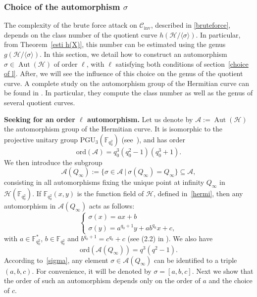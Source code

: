 \documentclass[10pt]{article}
\theoremstyle{definition}
\theoremstyle{definition}
\theoremstyle{definition}
\newcommand{\C}{\mathcal{C}}
\newcommand{\calA}{\mathcal{A}}
\newcommand{\calH}{\mathcal{H}}
\newcommand{\su}{\subseteq}
\newcommand{\h}{\mathcal{H}}
\newcommand{\Aut}{\operatorname{Aut}}
\begin{document}
\subsubsection{Choice of the automorphism $\sigma$} \label{choice_of_sigma}


The complexity of the brute force attack on $\C_{\textrm{inv}}$, described in \ref{bruteforce}, depends on the class number of the quotient curve $h(\mathcal{H}/\langle \sigma \rangle)$. In particular, from Theorem~\ref{esti h(X)}, this number can be estimated using the genus $g(\mathcal{H}/\langle \sigma \rangle)$. In this section, we detail how to construct an automorphism $\sigma \in \Aut(\h)$ of order $\ell$, with $\ell$ satisfying both conditions of section~\ref{choice of l}. After, we will see the influence of this choice on the genus of the quotient curve. A complete study on the automorphism group of the Hermitian curve can be found in \cite{Gar}. In particular, they compute the class number as well as the genus of several quotient curves. 

\vspace*{0.2cm}

\noindent \textbf{Seeking for an order $\ell$ automorphism.} Let us denote by $\calA := \Aut(\calH)$ the automorphism group of the Hermitian curve. It is isomorphic to the projective unitary group $\mathrm{PGU}_3(\mathbb{F}_{q_0^2})$ (see~\cite{Sti}), and has order 
\[\mathrm{ord}(\calA) =  q_0^3(q_0^2-1)(q_0^3+1).\]
We then introduce the subgroup
\[\calA(Q_{\infty}) := \{ \sigma \in \calA \ | \ \sigma(Q_{\infty}) = Q_{\infty}\} \su \calA ,\]
consisting in all automorphisms fixing the unique point at infinity $Q_{\infty}$ in $\calH(\mathbb{F}_{q_0^2})$. If $\mathbb{F}_{q_0^2}(x,y)$ is the function field of $\h$, defined in~\eqref{hermi}, then any automorphism in $\calA(Q_{\infty})$ acts as follows:
\begin{equation} \label{sigma}
\left\{ \begin{array}{ll}
\sigma(x) = ax+b \\
\sigma(y) = a^{q_0+1}y+ab^{q_0}x+c,
\end{array} \right.
\end{equation}
with $a \in \mathbb{F}_{q_0^2}^*$, $b \in \mathbb{F}_{q_0^2}$ and $b^{q_0+1} = c^{q_0}+c$ (see (2.2) in \cite{Gar}). We also have 
\[\mathrm{ord}(\calA(Q_{\infty})) = q^3(q^2-1).\]
According to~\eqref{sigma}, any element $\sigma \in \calA(Q_{\infty})$ can be identified to a triple $(a,b,c)$. For convenience, it will be denoted by $\sigma=[a,b,c]$.
Next we show that the order of such an automorphism depends only on the order of $a$ and the choice of $c$.
\end{document}
